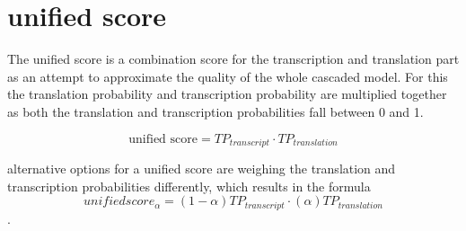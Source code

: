\section{unified score}
The unified score is a combination score for the transcription and translation part as an attempt to approximate the quality of the whole cascaded model. 
For this the translation probability and transcription probability are multiplied together as both the translation and transcription probabilities fall between 0 and 1. 

$$\text{unified score}= TP_{transcript}\cdot TP_{translation}$$

alternative options for a unified score are weighing the translation and transcription probabilities differently, which results in the formula $$unifiedscore_\alpha= (1-\alpha) TP_{transcript} \cdot (\alpha)TP_{translation}$$. 
